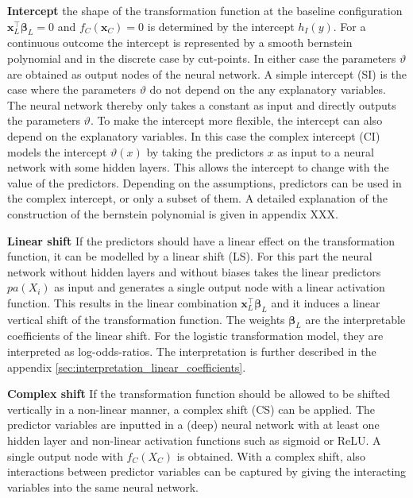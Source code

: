 \textbf{Intercept } the shape of the transformation function at the baseline configuration $\mathbf{x}_L^\top \boldsymbol{\beta}_L = 0$ and $f_C(\mathbf{x}_C)=0$ is determined by the intercept $h_I(y)$. For a continuous outcome the intercept is represented by a smooth bernstein polynomial and in the discrete case by cut-points. In either case the parameters $\vartheta$ are obtained as output nodes of the neural network. A simple intercept (SI) is the case where the parameters $\vartheta$ do not depend on the any explanatory variables. The neural network thereby only takes a constant as input and directly outputs the parameters $\vartheta$. To make the intercept more flexible, the intercept can also depend on the explanatory variables. In this case the complex intercept (CI) models the intercept $\vartheta(x)$ by taking the predictors $x$ as input to a neural network with some hidden layers. This allows the intercept to change with the value of the predictors. Depending on the assumptions, predictors can be used in the complex intercept, or only a subset of them. A detailed explanation of the construction of the bernstein polynomial is given in appendix XXX.

\textbf{Linear shift } If the predictors should have a linear effect on the transformation function, it can be modelled by a linear shift (LS). For this part the neural network without hidden layers and without biases takes the linear predictors $pa(X_i)$ as input and generates a single output node with a linear activation function. This results in the linear combination $\mathbf{x}_L^\top \boldsymbol{\beta}_L$ and it induces a linear vertical shift of the transformation function. The weights $\boldsymbol{\beta}_L$ are the interpretable coefficients of the linear shift. For the logistic transformation model, they are interpreted as log-odds-ratios.
The interpretation is further described in the appendix \ref{sec:interpretation_linear_coefficients}. %

\textbf{Complex shift } If the transformation function should be allowed to be shifted vertically in a non-linear manner, a complex shift (CS) can be applied. The predictor variables are inputted in a (deep) neural network with at least one hidden layer and non-linear activation functions such as sigmoid or ReLU. A single output node with $f_C(X_C)$ is obtained. With a complex shift, also interactions between predictor variables can be captured by giving the interacting variables into the same neural network.


